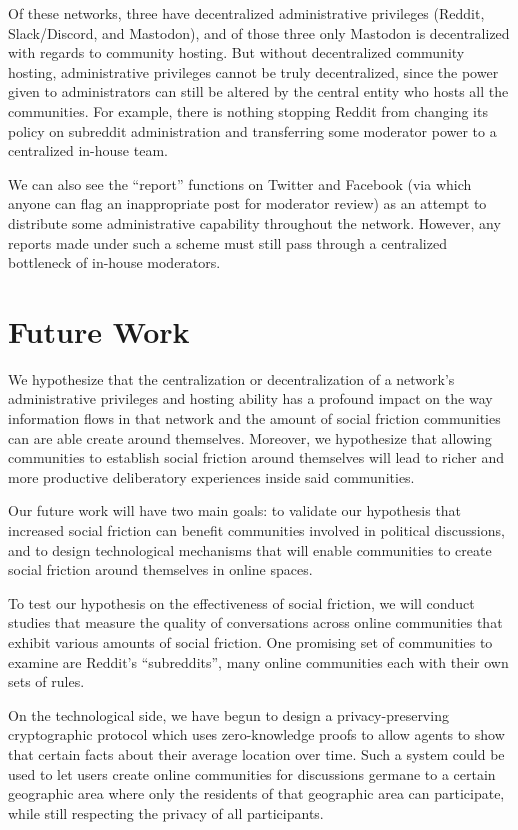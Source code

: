 \documentclass[sigconf,authordraft]{acmart}
\begin{document}
Of these networks, three have decentralized administrative privileges (Reddit, Slack/Discord, and Mastodon), and of those three only Mastodon is decentralized with regards to community hosting. But without decentralized community hosting, administrative privileges cannot be truly decentralized, since the power given to administrators can still be altered by the central entity who hosts all the communities. For example, there is nothing stopping Reddit from changing its policy on subreddit administration and transferring some moderator power to a centralized in-house team.

We can also see the ``report'' functions on Twitter and Facebook (via which anyone can flag an inappropriate post for moderator review) as an attempt to distribute some administrative capability throughout the network. However, any reports made under such a scheme must still pass through a centralized bottleneck of in-house moderators. 

\section{Future Work}

We hypothesize that the centralization or decentralization of a network's administrative privileges and hosting ability has a profound impact on the way information flows in that network and the amount of social friction communities can are able create around themselves. Moreover, we hypothesize that allowing communities to establish social friction around themselves will lead to richer and more productive deliberatory experiences inside said communities.

Our future work will have two main goals: to validate our hypothesis that increased social friction can benefit communities involved in political discussions, and to design technological mechanisms that will enable communities to create social friction around themselves in online spaces. 

To test our hypothesis on the effectiveness of social friction, we will conduct studies that measure the quality of conversations across online communities that exhibit various amounts of social friction. One promising set of communities to examine are Reddit's ``subreddits'', many online communities each with their own sets of rules.

On the technological side, we have begun to design a privacy-preserving cryptographic protocol which uses zero-knowledge proofs \cite{goldreich1991proofs} to allow agents to show that certain facts about their average location over time. Such a system could be used to let users create online communities for discussions germane to a certain geographic area where only the residents of that geographic area can participate, while still respecting the privacy of all participants.
\end{document}
